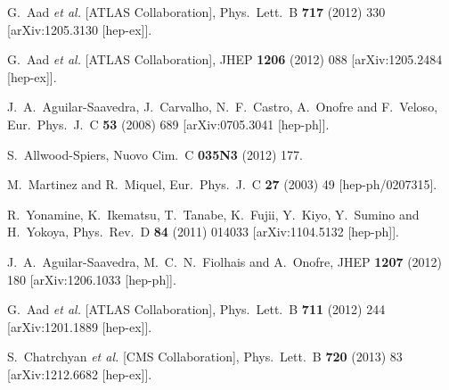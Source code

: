 \documentclass[12pt,a4paper]{article}
\begin{document}
\begin{thebibliography}{99}
  G.~Aad {\it et al.}  [ATLAS Collaboration],
  Phys.\ Lett.\ B {\bf 717} (2012) 330
  [arXiv:1205.3130 [hep-ex]].


  G.~Aad {\it et al.}  [ATLAS Collaboration],
  JHEP {\bf 1206} (2012) 088
  [arXiv:1205.2484 [hep-ex]].

  J.~A.~Aguilar-Saavedra, J.~Carvalho, N.~F.~Castro, A.~Onofre and F.~Veloso,
  Eur.\ Phys.\ J.\ C {\bf 53} (2008) 689
  [arXiv:0705.3041 [hep-ph]].

  S.~Allwood-Spiers,
  Nuovo Cim.\ C {\bf 035N3} (2012) 177.

  M.~Martinez and R.~Miquel,
  Eur.\ Phys.\ J.\ C {\bf 27} (2003) 49
  [hep-ph/0207315].

  R.~Yonamine, K.~Ikematsu, T.~Tanabe, K.~Fujii, Y.~Kiyo, Y.~Sumino and H.~Yokoya,
  Phys.\ Rev.\ D {\bf 84} (2011) 014033
  [arXiv:1104.5132 [hep-ph]].

  J.~A.~Aguilar-Saavedra, M.~C.~N.~Fiolhais and A.~Onofre,
  JHEP {\bf 1207} (2012) 180
  [arXiv:1206.1033 [hep-ph]].

  G.~Aad {\it et al.}  [ATLAS Collaboration],
  Phys.\ Lett.\ B {\bf 711} (2012) 244
  [arXiv:1201.1889 [hep-ex]].

  S.~Chatrchyan {\it et al.}  [CMS Collaboration],
  Phys.\ Lett.\ B {\bf 720} (2013) 83
  [arXiv:1212.6682 [hep-ex]].


\end{thebibliography}
\end{document}
